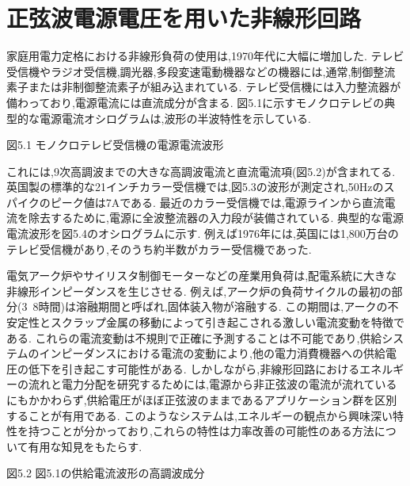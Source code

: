 \documentclass[fleqn,11pt,a4paper,dvipdfmx]{jsarticle}
\begin{document}
%
%
\section{正弦波電源電圧を用いた非線形回路}

家庭用電力定格における非線形負荷の使用は,1970年代に大幅に増加した.
テレビ受信機やラジオ受信機,調光器,多段変速電動機器などの機器には,通常,制御整流素子または非制御整流素子が組み込まれている.
テレビ受信機には入力整流器が備わっており,電源電流には直流成分が含まる.
図5.1に示すモノクロテレビの典型的な電源電流オシログラムは,波形の半波特性を示している.

図5.1 モノクロテレビ受信機の電源電流波形

これには,9次高調波までの大きな高調波電流と直流電流項(図5.2)が含まれてる.
英国製の標準的な21インチカラー受信機では,図5.3の波形が測定され,50Hzのスパイクのピーク値は7Aである.
最近のカラー受信機では,電源ラインから直流電流を除去するために,電源に全波整流器の入力段が装備されている.
典型的な電源電流波形を図5.4のオシログラムに示す.
例えば1976年には,英国には1,800万台のテレビ受信機があり,そのうち約半数がカラー受信機であった.

電気アーク炉やサイリスタ制御モーターなどの産業用負荷は,配電系統に大きな非線形インピーダンスを生じさせる.
例えば,アーク炉の負荷サイクルの最初の部分(3~8時間)は溶融期間と呼ばれ,固体装入物が溶融する.
この期間は,アークの不安定性とスクラップ金属の移動によって引き起こされる激しい電流変動を特徴である.
これらの電流変動は不規則で正確に予測することは不可能であり,供給システムのインピーダンスにおける電流の変動により,他の電力消費機器への供給電圧の低下を引き起こす可能性がある.
しかしながら,非線形回路におけるエネルギーの流れと電力分配を研究するためには,電源から非正弦波の電流が流れているにもかかわらず,供給電圧がほぼ正弦波のままであるアプリケーション群を区別することが有用である.
このようなシステムは,エネルギーの観点から興味深い特性を持つことが分かっており,これらの特性は力率改善の可能性のある方法について有用な知見をもたらす.

図5.2 図5.1の供給電流波形の高調波成分


%
%
\end{document}
